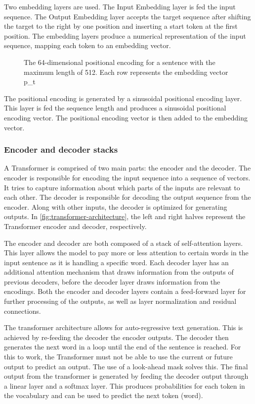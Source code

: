Two embedding layers are used. The Input Embedding layer is fed the input sequence. The Output Embedding layer accepts the target sequence after shifting the target to the right by one position and inserting a start token at the first position. The embedding layers produce a numerical representation of the input sequence, mapping each token to an embedding vector.

\begin{figure}[htp]
    \centering
    
    \caption{The 64-dimensional positional encoding for a sentence with the maximum length of 512. Each row represents the embedding vector p\_t}
\end{figure}

The positional encoding is generated by a sinusoidal positional encoding layer. This layer is fed the sequence length and produces a sinusoidal positional encoding vector. The positional encoding vector is then added to the embedding vector.

\subsubsection{Encoder and decoder stacks}
\label{sec:encoder-decoder-stacks}
A Transformer is comprised of two main parts: the encoder and the decoder. The encoder is responsible for encoding the input sequence into a sequence of vectors. It tries to capture information about which parts of the inputs are relevant to each other. The decoder is responsible for decoding the output sequence from the encoder. Along with other inputs, the decoder is optimized for generating outputs. In \cref{fig:transformer-architecture}, the left and right halves represent the Transformer encoder and decoder, respectively. 

The encoder and decoder are both composed of a stack of self-attention layers. This layer allows the model to pay more or less attention to certain words in the input sentence as it is handling a specific word. Each decoder layer has an additional attention mechanism that draws information from the outputs of previous decoders, before the decoder layer draws information from the encodings. Both the encoder and decoder layers contain a feed-forward layer for further processing of the outputs, as well as layer normalization and residual connections.

The transformer architecture allows for auto-regressive text generation. This is achieved by re-feeding the decoder the encoder outputs. The decoder then generates the next word in a loop until the end of the sentence is reached. For this to work, the  Transformer must not be able to use the current or future output to predict an output. The use of a look-ahead mask solves this. The final output from the transformer is generated by feeding the decoder output through a linear layer and a softmax layer. This produces probabilities for each token in the vocabulary and can be used to predict the next token (word).

